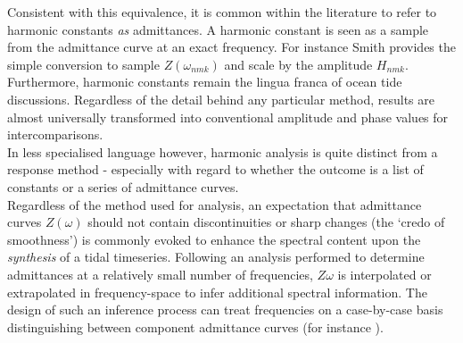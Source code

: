 Consistent with this equivalence, it is common within the literature to refer to harmonic constants \emph{as} admittances.   A harmonic constant is seen as a sample from the admittance curve at an exact frequency. For instance Smith\cite{Smith:1997ut} provides the simple conversion to sample $Z(\omega_{nmk})$ and scale by the \ATGP{} amplitude $H_{nmk}$.
Furthermore, harmonic constants remain the lingua franca of ocean tide discussions. Regardless of the detail behind any particular method, results are almost universally transformed into conventional amplitude and phase values for intercomparisons.\\
In less specialised language however, harmonic analysis is quite distinct from a response method - especially with regard to whether the outcome is a list of constants or a series of admittance curves.\\




Regardless of the method used for analysis, an expectation that admittance curves $Z(\omega)$ should not contain discontinuities or sharp changes (the `credo of smoothness') is commonly evoked to enhance the spectral content upon the \emph{synthesis} of a tidal timeseries.  Following an analysis performed to determine admittances at a relatively small number of frequencies, $Z{\omega}$ is interpolated or extrapolated in frequency-space to infer additional spectral information.   The design of such an inference process can treat frequencies on a case-by-case basis distinguishing between component admittance curves (for instance \citep[pp 268]{Fu:2001ub}).




